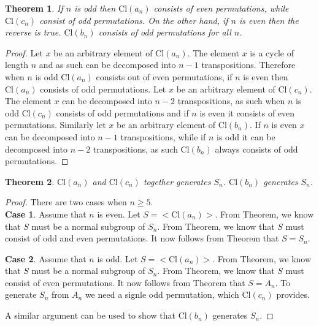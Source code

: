 \documentclass[a4paper,10pt]{article}
\newtheorem{theorem}{Theorem}
\begin{document}
\begin{theorem}
If $n$ is odd then $\textrm{Cl}(a_n)$ consists of even permutations, while $\textrm{Cl}(c_n)$ consist of odd permutations. On the other hand, if $n$ is even then the reverse is true. $\textrm{Cl}(b_n)$ consists of odd permutations for all $n$.     
\end{theorem}
\begin{proof}
Let $x$ be an arbitrary element of $\textrm{Cl}(a_n)$. The element $x$ is a cycle of length $n$ and as such can be decomposed into $n-1$ transpositions. Therefore when $n$ is odd $\textrm{Cl}(a_n)$ consists out of even permutations, if $n$ is even then $\textrm{Cl}(a_n)$ consists of odd permutations. Let $x$ be an arbitrary element of $\textrm{Cl}(c_n)$. The element $x$ can be decomposed into $n-2$ transpositions, as such when $n$ is odd $\textrm{Cl}(c_n)$ consists of odd permutations and if $n$ is even it consists of even permutations. Similarly let $x$ be an arbitrary element of $\textrm{Cl}(b_n)$. If $n$ is even $x$ can be decomposed into $n-1$ transpositions, while if $n$ is odd it can be decomposed into $n-2$ transpositions, as such $\textrm{Cl}(b_n)$ always consists of odd permutations.     
\end{proof}

\begin{theorem}
$\textrm{Cl}(a_n)$ and $\textrm{Cl}(c_n)$ together generates $S_n$. $\textrm{Cl}(b_n)$ generates $S_n$. 
\end{theorem}
\begin{proof}
There are two cases when $n\geq 5$.\\

\textbf{Case 1}. Assume that $n$ is even. Let $S=<\textrm{Cl}(a_n)>$. From Theorem, we know that $S$ must be a normal subgroup of $S_n$. From Theorem, we know that $S$ must consist of odd and even permutations. It now follows from Theorem that $S=S_n$.

\textbf{Case 2}. Assume that $n$ is odd. Let $S=<\textrm{Cl}(a_n)>$. From Theorem, we know that $S$ must be a normal subgroup of $S_n$. From Theorem, we know that $S$ must consist of even permutations. It now follows from Theorem that $S=A_n$. To generate $S_n$ from $A_n$ we need a signle odd permutation, which $\textrm{Cl}(c_n)$ provides.  

A similar argument can be used to show that $\textrm{Cl}(b_n)$ generates $S_n$.
\end{proof}
\end{document}
